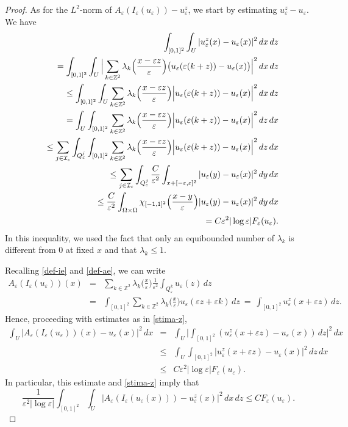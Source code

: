 \documentclass[11pt]{article}
\def\e{\varepsilon}
\begin{document}
\begin{proof}
As for the $L^2$-norm of $A_\e(I_\e(u_\e))-u_\e^z$, we start by estimating  $u_\e^z-u_\e$. We have 
\begin{eqnarray}\label{stima-z}
&&\hspace{-1cm}\int_{[0,1]^2}\int_{U}|u_\e^z(x)-u_\e(x)|^2\, dx\, dz\nonumber \\
&&=\int_{[0,1]^2}\int_{U}\Big|\sum_{k\in\mathbb Z^2}\lambda_k\Big(\frac{x-\e z}{\e}\Big) \big(u_\e(\e (k+z))-u_\e(x)\big)\Big|^2\, dx\, dz\nonumber\\
&&\leq \int_{[0,1]^2}\int_{U}\sum_{k\in\mathbb Z^2}\lambda_k\Big(\frac{x-\e z}{\e}\Big) \Big|u_\e(\e (k+z))-u_\e(x)\Big|^2\, dx\, dz\nonumber\\
&&=\int_{U} \int_{[0,1]^2}\sum_{k\in\mathbb Z^2}\lambda_k\Big(\frac{x-\e z}{\e}\Big) \Big|u_\e(\e (k+z))-u_\e(x)\Big|^2\, dz\, dx\nonumber\\
&&\leq\sum_{j\in\mathcal I_\e}\int_{Q_\e^j} \int_{[0,1]^2}\sum_{k\in\mathbb Z^2}\lambda_k\Big(\frac{x-\e z}{\e}\Big) \Big|u_\e(\e (k+z))-u_\e(x)\Big|^2\, dz\, dx\nonumber\\
&&\leq\sum_{j\in\mathcal I_\e}\int_{Q_\e^j} \frac{C}{\e^2}\int_{x+[-\e,\e]^2} |u_\e(y)-u_\e(x)|^2\, dy\, dx\nonumber\\
&&\leq\frac{C}{\e^2}\int_{\Omega\times\Omega}\chi_{[-1,1]^2}\Big(\frac{x-y}{\e}\Big) |u_\e(y)-u_\e(x)|^2\, dy\, dx\nonumber\\
&& 
=C\e^2|\log\e| F_\e(u_\e). 
\end{eqnarray} 
In this inequality, we used the fact that only an equibounded number of $\lambda_k$ is different from $0$ at fixed $x$ and that $\lambda_k\leq 1$. 

Recalling \eqref{def-ie} and \eqref{def-ae}, we can write 
\begin{eqnarray*}
A_\e(I_\e(u_\e))(x)
&=&\sum_{k\in\mathbb Z^2}\lambda_k\big(\frac{x}{\e}\big)\frac{1}{\e^2}\int_{Q_\e^k}u_\e(z)\, dz\\
&=&\int_{[0,1]^2}\sum_{k\in\mathbb Z^2}\lambda_k\big(\frac{x}{\e}\big)u_\e(\e z+\e k)\, dz\ =\ \int_{[0,1]^2}u_\e^z(x+\e z)\, dz. 
\end{eqnarray*}
Hence, proceeding with estimates as in \eqref{stima-z}, 
\begin{eqnarray}\label{conf-Aeu}\nonumber
\int_U| A_\e(I_\e(u_\e))(x) - u_\e(x)|^2\, dx
&=&\int_U\Big|\int_{[0,1]^2} (u_\e^z (x+\e z) - u_\e(x))\, dz\Big|^2\, dx\\\nonumber
&\leq&\int_U\int_{[0,1]^2} |u_\e^z (x+\e z) - u_\e(x)|^2\, dz\, dx\\
&\leq& C\e^2|\log \e| F_\e(u_\e).
\end{eqnarray}
In particular, this estimate and \eqref{stima-z} 
imply that 
\begin{equation}\label{stimaL2}
\frac{1}{\e^2|\log\e|}\int_{[0,1]^2}\int_U| A_\e(I_\e(u_\e (x))) - u^z_\e(x)|^2\, dx\, dz\le C F_\e(u_\e).
\end{equation}




\end{proof}
\end{document}
